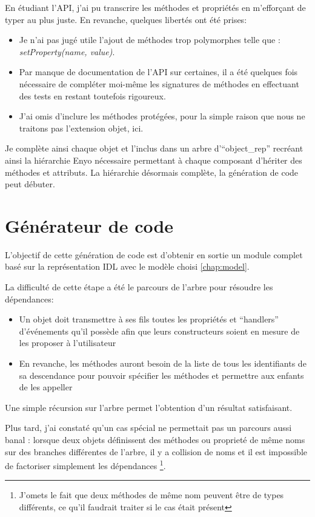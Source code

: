 \documentclass[11pt,a4paper]{report}
\begin{document}
En étudiant l'API, j'ai pu transcrire les méthodes et propriétés en m'efforçant de typer au plus juste.
En revanche, quelques libertés ont été prises:
\begin{itemize}
\item Je n'ai pas jugé utile l'ajout de méthodes trop polymorphes telle que : \emph{setProperty(name, value)}.
\item Par manque de documentation de l'API sur certaines, il a été quelques fois nécessaire de compléter 
  moi-même les signatures de méthodes en effectuant des tests en restant toutefois rigoureux.  
\item J'ai omis d'inclure les méthodes protégées, pour la simple raison que nous ne traitons pas
  l'extension objet, ici.
\end{itemize}\medskip

Je complète ainsi chaque objet et l'inclus dans un arbre d'``object\_rep'' recréant ainsi la hiérarchie
Enyo nécessaire permettant à chaque composant d'hériter des méthodes et attributs.
La hiérarchie désormais complète, la génération de code peut débuter.

\section{Générateur de code}

L'objectif de cette génération de code est d'obtenir en sortie un module complet basé sur la représentation
IDL avec le modèle choisi \ref{chap:model}.

La difficulté de cette étape a été le parcours de l'arbre pour résoudre les dépendances:
\begin{itemize}
\item Un objet doit transmettre à ses fils toutes les propriétés et ``handlers'' d'événements 
  qu'il possède afin que leurs constructeurs soient en mesure de les proposer à l'utilisateur
\item En revanche, les méthodes auront besoin de la liste de tous les identifiants de sa descendance pour
  pouvoir spécifier les méthodes et permettre aux enfants de les appeller
\end{itemize}\smallskip

Une simple récursion sur l'arbre permet l'obtention d'un résultat satisfaisant.

Plus tard, j'ai constaté qu'un cas spécial ne permettait pas un parcours aussi banal :
lorsque deux objets définissent des méthodes ou proprieté de même noms sur des branches différentes
de l'arbre, il y a collision de noms et il est impossible de factoriser simplement les dépendances
\footnote{J'omets le fait que deux méthodes de même nom peuvent être de types différents, 
ce qu'il faudrait traiter si le cas était présent}.
\end{document}
